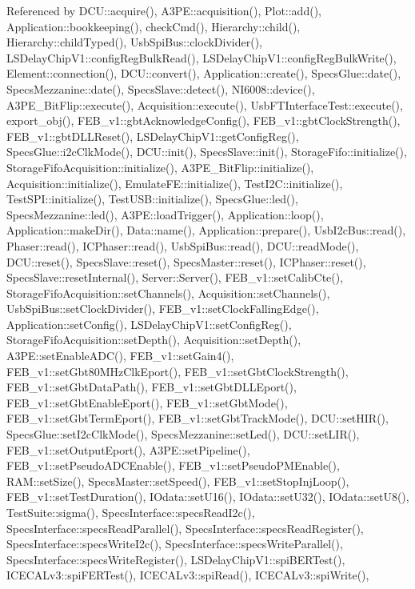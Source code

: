 Referenced by D\+C\+U\+::acquire(), A3\+P\+E\+::acquisition(), Plot\+::add(), Application\+::bookkeeping(), check\+Cmd(), Hierarchy\+::child(), Hierarchy\+::child\+Typed(), Usb\+Spi\+Bus\+::clock\+Divider(), L\+S\+Delay\+Chip\+V1\+::config\+Reg\+Bulk\+Read(), L\+S\+Delay\+Chip\+V1\+::config\+Reg\+Bulk\+Write(), Element\+::connection(), D\+C\+U\+::convert(), Application\+::create(), Specs\+Glue\+::date(), Specs\+Mezzanine\+::date(), Specs\+Slave\+::detect(), N\+I6008\+::device(), A3\+P\+E\+\_\+\+Bit\+Flip\+::execute(), Acquisition\+::execute(), Usb\+F\+T\+Interface\+Test\+::execute(), export\+\_\+obj(), F\+E\+B\+\_\+v1\+::gbt\+Acknowledge\+Config(), F\+E\+B\+\_\+v1\+::gbt\+Clock\+Strength(), F\+E\+B\+\_\+v1\+::gbt\+D\+L\+L\+Reset(), L\+S\+Delay\+Chip\+V1\+::get\+Config\+Reg(), Specs\+Glue\+::i2c\+Clk\+Mode(), D\+C\+U\+::init(), Specs\+Slave\+::init(), Storage\+Fifo\+::initialize(), Storage\+Fifo\+Acquisition\+::initialize(), A3\+P\+E\+\_\+\+Bit\+Flip\+::initialize(), Acquisition\+::initialize(), Emulate\+F\+E\+::initialize(), Test\+I2\+C\+::initialize(), Test\+S\+P\+I\+::initialize(), Test\+U\+S\+B\+::initialize(), Specs\+Glue\+::led(), Specs\+Mezzanine\+::led(), A3\+P\+E\+::load\+Trigger(), Application\+::loop(), Application\+::make\+Dir(), Data\+::name(), Application\+::prepare(), Usb\+I2c\+Bus\+::read(), Phaser\+::read(), I\+C\+Phaser\+::read(), Usb\+Spi\+Bus\+::read(), D\+C\+U\+::read\+Mode(), D\+C\+U\+::reset(), Specs\+Slave\+::reset(), Specs\+Master\+::reset(), I\+C\+Phaser\+::reset(), Specs\+Slave\+::reset\+Internal(), Server\+::\+Server(), F\+E\+B\+\_\+v1\+::set\+Calib\+Cte(), Storage\+Fifo\+Acquisition\+::set\+Channels(), Acquisition\+::set\+Channels(), Usb\+Spi\+Bus\+::set\+Clock\+Divider(), F\+E\+B\+\_\+v1\+::set\+Clock\+Falling\+Edge(), Application\+::set\+Config(), L\+S\+Delay\+Chip\+V1\+::set\+Config\+Reg(), Storage\+Fifo\+Acquisition\+::set\+Depth(), Acquisition\+::set\+Depth(), A3\+P\+E\+::set\+Enable\+A\+D\+C(), F\+E\+B\+\_\+v1\+::set\+Gain4(), F\+E\+B\+\_\+v1\+::set\+Gbt80\+M\+Hz\+Clk\+Eport(), F\+E\+B\+\_\+v1\+::set\+Gbt\+Clock\+Strength(), F\+E\+B\+\_\+v1\+::set\+Gbt\+Data\+Path(), F\+E\+B\+\_\+v1\+::set\+Gbt\+D\+L\+L\+Eport(), F\+E\+B\+\_\+v1\+::set\+Gbt\+Enable\+Eport(), F\+E\+B\+\_\+v1\+::set\+Gbt\+Mode(), F\+E\+B\+\_\+v1\+::set\+Gbt\+Term\+Eport(), F\+E\+B\+\_\+v1\+::set\+Gbt\+Track\+Mode(), D\+C\+U\+::set\+H\+I\+R(), Specs\+Glue\+::set\+I2c\+Clk\+Mode(), Specs\+Mezzanine\+::set\+Led(), D\+C\+U\+::set\+L\+I\+R(), F\+E\+B\+\_\+v1\+::set\+Output\+Eport(), A3\+P\+E\+::set\+Pipeline(), F\+E\+B\+\_\+v1\+::set\+Pseudo\+A\+D\+C\+Enable(), F\+E\+B\+\_\+v1\+::set\+Pseudo\+P\+M\+Enable(), R\+A\+M\+::set\+Size(), Specs\+Master\+::set\+Speed(), F\+E\+B\+\_\+v1\+::set\+Stop\+Inj\+Loop(), F\+E\+B\+\_\+v1\+::set\+Test\+Duration(), I\+Odata\+::set\+U16(), I\+Odata\+::set\+U32(), I\+Odata\+::set\+U8(), Test\+Suite\+::sigma(), Specs\+Interface\+::specs\+Read\+I2c(), Specs\+Interface\+::specs\+Read\+Parallel(), Specs\+Interface\+::specs\+Read\+Register(), Specs\+Interface\+::specs\+Write\+I2c(), Specs\+Interface\+::specs\+Write\+Parallel(), Specs\+Interface\+::specs\+Write\+Register(), L\+S\+Delay\+Chip\+V1\+::spi\+B\+E\+R\+Test(), I\+C\+E\+C\+A\+Lv3\+::spi\+F\+E\+R\+Test(), I\+C\+E\+C\+A\+Lv3\+::spi\+Read(), I\+C\+E\+C\+A\+Lv3\+::spi\+Write(), 